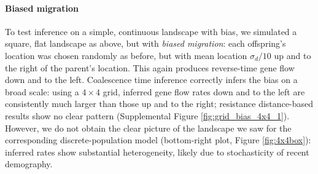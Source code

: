 \documentclass{article}
\begin{document}
\paragraph{Biased migration}
To test inference on a simple, continuous landscape with bias, 
we simulated a square, flat landscape as above,
but with \emph{biased migration}: 
each offspring's location was chosen randomly as before,
but with mean location $\sigma_d/10$
up and to the right of the parent's location.
This again produces reverse-time gene flow down and to the left.
Coalescence time inference correctly infers the bias on a broad scale:
using a $4 \times 4$ grid,
inferred gene flow rates down and to the left are consistently much larger
than those up and to the right;
resistance distance-based results show no clear pattern
(Supplemental Figure \ref{fig:grid_bias_4x4_1}).
However, we do not obtain the clear picture of the landscape
we saw for the corresponding discrete-population model
(bottom-right plot, Figure \ref{fig:4x4box}):
inferred rates show substantial heterogeneity,
likely due to stochasticity of recent demography.
\end{document}
